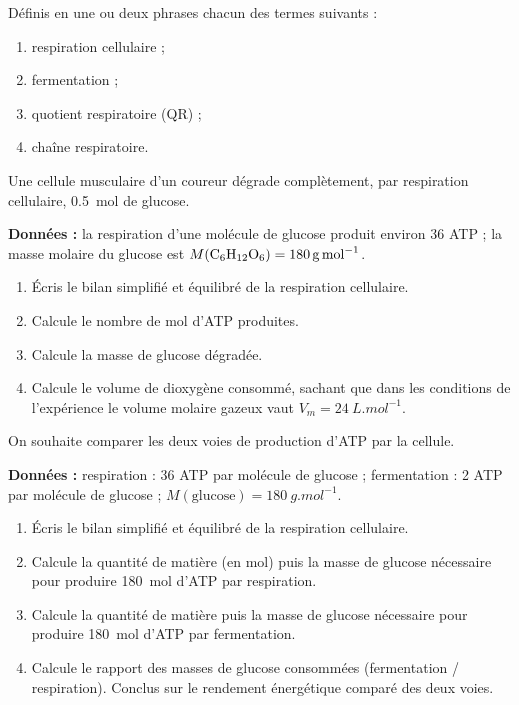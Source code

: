\documentclass[11pt]{article}
\newcounter{popsec}
\newcounter{popsub}
\newcommand{\courssub}[1]{%
  \stepcounter{popsub}%
  \par\vspace{9pt}\noindent{\popxbold\fontsize{11.5}{13}\selectfont\color{popink}{\color{poporange}\thepopsec.\thepopsub}\hspace{6pt}#1}\par\nopagebreak\vspace{4pt}
}
\begin{document}
\begin{exercice}[Définitions]
Définis en une ou deux phrases chacun des termes suivants :
\begin{enumerate}
\item respiration cellulaire ;
\item fermentation ;
\item quotient respiratoire (QR) ;
\item chaîne respiratoire.
\end{enumerate}
\end{exercice}

\begin{exercice}
Une cellule musculaire d'un coureur dégrade complètement, par respiration cellulaire, \num{0,5}~mol de glucose.

\textbf{Données :} la respiration d'une molécule de glucose produit environ 36 ATP ; la masse molaire du glucose est $M(\ce{C6H12O6}) = \SI{180}{g.mol^{-1}}$.

\begin{enumerate}
\item Écris le bilan simplifié et équilibré de la respiration cellulaire.
\item Calcule le nombre de mol d'ATP produites.
\item Calcule la masse de glucose dégradée.
\item Calcule le volume de dioxygène consommé, sachant que dans les conditions de l'expérience le volume molaire gazeux vaut $V_m = \SI{24}{L.mol^{-1}}$.
\end{enumerate}
\end{exercice}

\courssub{Je m'entraîne}

\begin{exercice}
On souhaite comparer les deux voies de production d'ATP par la cellule.

\textbf{Données :} respiration : 36 ATP par molécule de glucose ; fermentation : 2 ATP par molécule de glucose ; $M(\text{glucose}) = \SI{180}{g.mol^{-1}}$.

\begin{enumerate}
\item Écris le bilan simplifié et équilibré de la respiration cellulaire.
\item Calcule la quantité de matière (en mol) puis la masse de glucose nécessaire pour produire 180~mol d'ATP par respiration.
\item Calcule la quantité de matière puis la masse de glucose nécessaire pour produire 180~mol d'ATP par fermentation.
\item Calcule le rapport des masses de glucose consommées (fermentation / respiration). Conclus sur le rendement énergétique comparé des deux voies.
\end{enumerate}
\end{exercice}
\end{document}
